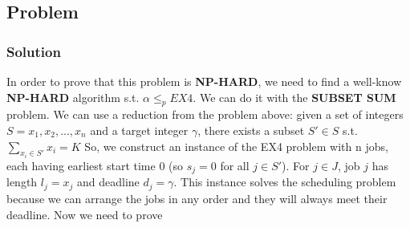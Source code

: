\documentclass[11pt]{article}
\begin{document}
\subsection*{Problem}

\subsubsection*{Solution}
In order to prove that this problem is \textbf{NP-HARD}, we need to find a well-know \textbf{NP-HARD} algorithm s.t. $\alpha \le_p EX4$. We can do it with the \textbf{SUBSET SUM} problem. We can use a reduction from the problem above: given a set of integers $S = {x_1, x_2, ..., x_n}$ and a target integer $\gamma$, there exists a subset $S' \in S$ s.t. $\sum\limits_{x_i \in S'}x_i = K$
So, we construct an instance of the EX4 problem with n jobs, each having earliest start time $0$ (so $s_j = 0$ for all $j \in S'$). For $j \in J$, job $j$ has length $l_j = x_j$ and deadline $d_j = \gamma$. This instance solves the scheduling problem because we can arrange the jobs in any order and they will always meet their deadline. Now we need to prove
\end{document}
